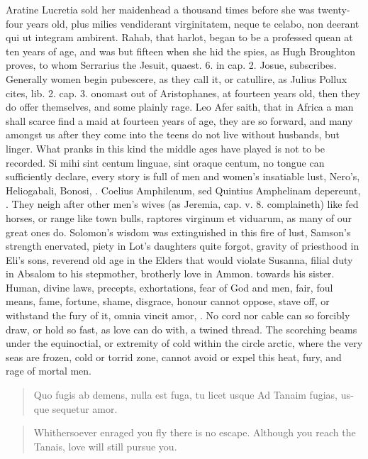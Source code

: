 Aratine Lucretia sold her maidenhead a thousand times before she
was twenty-four years old, plus milies vendiderant virginitatem, \etc{}
neque te celabo, non deerant qui ut integram ambirent. Rahab, that
harlot, began to be a professed quean at ten years of age, and was but
fifteen when she hid the spies, as Hugh Broughton proves, to whom
Serrarius the Jesuit, quaest. 6. in cap. 2. Josue, subscribes.
Generally women begin pubescere, as they call it, or catullire, as
Julius Pollux cites, lib. 2. cap. 3. onomast out of Aristophanes,
at fourteen years old, then they do offer themselves, and some
plainly rage. Leo Afer saith, that in Africa a man shall scarce
find a maid at fourteen years of age, they are so forward, and many
amongst us after they come into the teens do not live without husbands,
but linger. What pranks in this kind the middle ages have played is not
to be recorded. Si mihi sint centum linguae, sint oraque centum, no
tongue can sufficiently declare, every story is full of men and women's
insatiable lust, Nero's, Heliogabali, Bonosi, \etc{}.  Coelius
Amphilenum, sed Quintius Amphelinam depereunt, \etc{}. They neigh after
other men's wives (as Jeremia, cap. v. 8. complaineth) like fed horses,
or range like town bulls, raptores virginum et viduarum, as many of our
great ones do. Solomon's wisdom was extinguished in this fire of lust,
Samson's strength enervated, piety in Lot's daughters quite forgot,
gravity of priesthood in Eli's sons, reverend old age in the Elders
that would violate Susanna, filial duty in Absalom to his stepmother,
brotherly love in Ammon. towards his sister. Human, divine laws,
precepts, exhortations, fear of God and men, fair, foul means, fame,
fortune, shame, disgrace, honour cannot oppose, stave off, or withstand
the fury of it, omnia vincit amor, \etc{}. No cord nor cable can so
forcibly draw, or hold so fast, as love can do with, a twined thread.
The scorching beams under the equinoctial, or extremity of cold within
the circle arctic, where the very seas are frozen, cold or torrid zone,
cannot avoid or expel this heat, fury, and rage of mortal men.

\begin{latin}
\begin{verse}%
Quo fugis ab demens, nulla est fuga, tu licet usque
Ad Tanaim fugias, usque sequetur amor.
\end{verse}%
\end{latin}
\translationrule%
\begin{verse}%
Whithersoever enraged you fly there is no escape.
Although you reach the Tanais, love will still pursue you.
\end{verse}%

